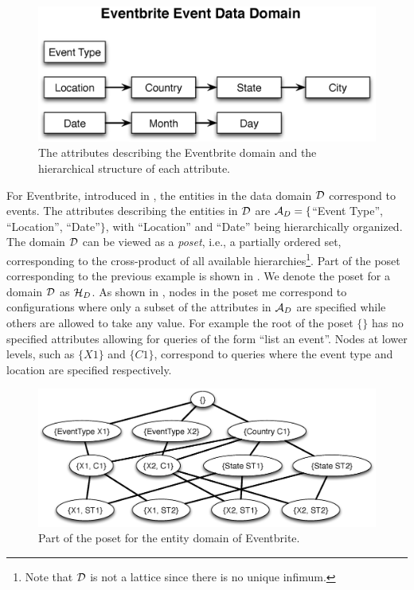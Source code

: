\begin{figure}[h]
	\begin{center}
	\includegraphics[clip,scale=0.33]{figs/eventsDomain.eps}
	\vspace{-10pt}
	\caption{The attributes describing the Eventbrite domain and the hierarchical structure of each attribute.}
	\label{fig:eventsdomain}
	\end{center}
	\vspace{-20pt}
\end{figure}
\fi
\ifpaper
For Eventbrite, introduced in , the entities in the data domain $\mathcal{D}$ correspond to events. The attributes describing the entities in $\mathcal{D}$ are $\mathcal{A}_D = \{$``Event Type'', ``Location'', ``Date''$\}$, with ``Location'' and ``Date'' being hierarchically organized.
\fi
The domain $\mathcal{D}$ can be viewed as a {\em poset}, i.e., a partially ordered set, corresponding to the cross-product of all available hierarchies\footnote{Note that $\mathcal{D}$ is not a lattice since there is no unique infimum.}. Part of the poset corresponding to the previous example is shown in . We denote the poset for a domain $\mathcal{D}$ as $\mathcal{H}_D$. As shown in , nodes in the poset me correspond to configurations where only a subset of the attributes in $\mathcal{A}_D$ are specified while others are allowed to take any value. For example the root of the poset $\{\}$ has no specified attributes allowing for queries of the form ``list an event''. Nodes at lower levels, such as $\{X1\}$ and $\{C1\}$, correspond to queries where the event type and location are specified respectively. 

\begin{figure}[h]
	\begin{center}
	\includegraphics[clip,scale=0.3]{figs/eventsExLattice.eps}
	\caption{Part of the poset for the entity domain of Eventbrite.}
	\label{fig:eventslattice}
	\vspace{-20pt}
	\end{center}
\end{figure}

